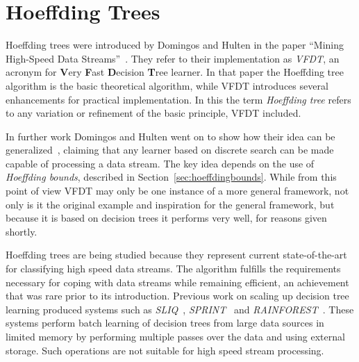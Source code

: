 \chapter{Hoeffding Trees}
\label{chap:hoeffdingtrees} 


Hoeffding trees were introduced by Domingos and Hulten in the paper ``Mining High-Speed Data Streams''~\cite{vfdt}. They refer to their implementation as {\em VFDT}, an acronym for {\bf V}ery {\bf F}ast {\bf D}ecision {\bf T}ree learner. In that paper the Hoeffding tree algorithm is the basic theoretical algorithm, while VFDT introduces several enhancements for practical implementation. In this \thesis  the term {\it Hoeffding tree} refers to any variation or refinement of the basic principle, VFDT included.

In further work Domingos and Hulten went on to show how their idea can be generalized~\cite{mineabitrarydb}, claiming that any learner based on discrete search can be made capable of processing a data stream. The key idea depends on the use of {\it Hoeffding bounds}, described in Section~\ref{sec:hoeffdingbounds}. While from this point of view VFDT may only be one instance of a more general framework, not only is it the original example and inspiration for the general framework, but because it is based on decision trees it performs very well, for reasons given shortly.

Hoeffding trees are being studied because they represent current state-of-the-art for classifying high speed data streams. The algorithm fulfills the requirements necessary for coping with data streams while remaining efficient, an achievement that was rare prior to its introduction. Previous work on scaling up decision tree learning produced systems such as {\it SLIQ}~\cite{sliq}, {\it SPRINT}~\cite{sprint} and {\it RAINFOREST}~\cite{rainforest}. These systems perform batch learning of decision trees from large data sources in limited memory by performing multiple passes over the data and using external storage. Such operations are not suitable for high speed stream processing.

